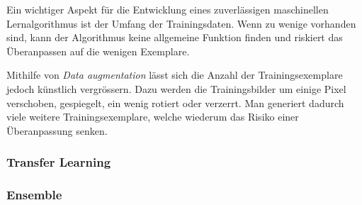 Ein wichtiger Aspekt für die Entwicklung eines zuverlässigen maschinellen Lernalgorithmus ist der Umfang der Trainingsdaten. Wenn zu wenige vorhanden sind, kann der Algorithmus keine allgemeine Funktion finden und riskiert das Überanpassen auf die wenigen Exemplare.

Mithilfe von \textit{Data augmentation} lässt sich die Anzahl der Trainingsexemplare jedoch künstlich vergrössern. Dazu werden die Trainingsbilder um einige Pixel verschoben, gespiegelt, ein wenig rotiert oder verzerrt. Man generiert dadurch viele weitere Trainingsexemplare, welche wiederum das Risiko einer Überanpassung senken.

\subsubsection{Transfer Learning}

\subsubsection{Ensemble}
























